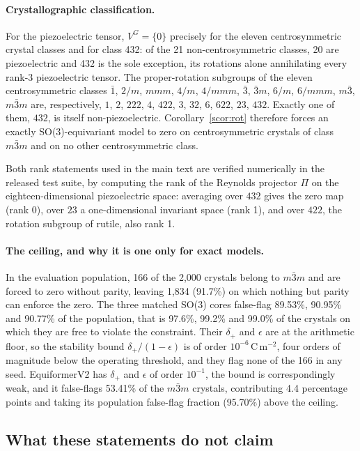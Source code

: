 \paragraph{Crystallographic classification.} For the piezoelectric tensor, $V^{G}=\{0\}$ precisely for the eleven centrosymmetric crystal classes and for class 432: of the 21 non-centrosymmetric classes, 20 are piezoelectric and 432 is the sole exception, its rotations alone annihilating every rank-3 piezoelectric tensor\cite{nye1985crystals}. The proper-rotation subgroups of the eleven centrosymmetric classes $\bar 1$, $2/m$, $mmm$, $4/m$, $4/mmm$, $\bar 3$, $\bar 3 m$, $6/m$, $6/mmm$, $m\bar 3$, $m\bar 3 m$ are, respectively, $1$, $2$, $222$, $4$, $422$, $3$, $32$, $6$, $622$, $23$, $432$. Exactly one of them, $432$, is itself non-piezoelectric. Corollary~\ref{scor:rot} therefore forces an exactly SO(3)-equivariant model to zero on centrosymmetric crystals of class $m\bar 3 m$ and on no other centrosymmetric class.

Both rank statements used in the main text are verified numerically in the released test suite, by computing the rank of the Reynolds projector $\Pi$ on the eighteen-dimensional piezoelectric space: averaging over $432$ gives the zero map (rank 0), over $23$ a one-dimensional invariant space (rank 1), and over $422$, the rotation subgroup of rutile, also rank 1.

\paragraph{The ceiling, and why it is one only for exact models.} In the evaluation population, 166 of the 2,000 crystals belong to $m\bar 3 m$ and are forced to zero without parity, leaving 1,834 (91.7\%) on which nothing but parity can enforce the zero. The three matched SO(3) cores false-flag 89.53\%, 90.95\% and 90.77\% of the population, that is 97.6\%, 99.2\% and 99.0\% of the crystals on which they are free to violate the constraint. Their $\delta_{+}$ and $\epsilon$ are at the arithmetic floor, so the stability bound $\delta_{+}/(1-\epsilon)$ is of order $10^{-6}$\,C\,m$^{-2}$, four orders of magnitude below the operating threshold, and they flag none of the 166 in any seed. EquiformerV2 has $\delta_{+}$ and $\epsilon$ of order $10^{-1}$, the bound is correspondingly weak, and it false-flags 53.41\% of the $m\bar 3 m$ crystals, contributing 4.4 percentage points and taking its population false-flag fraction (95.70\%) above the ceiling.

\subsection*{What these statements do not claim}

